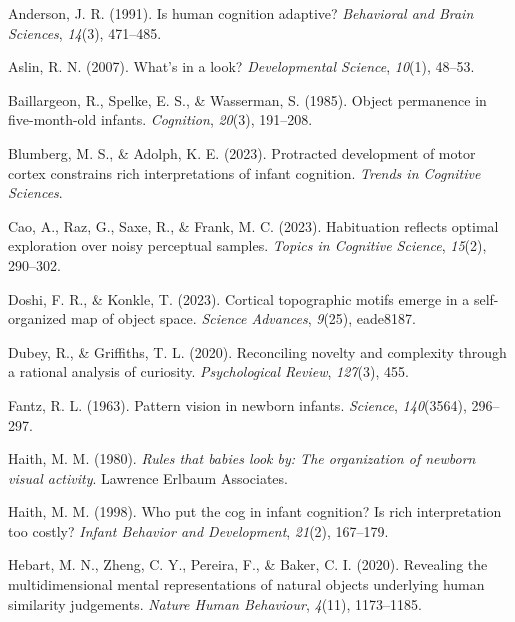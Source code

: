 \documentclass[10pt, letterpaper]{article}
\newenvironment{CSLReferences}%
  {}%
  {\par}
\begin{document}
\hypertarget{refs}{}
\begin{CSLReferences}{1}{0}
\leavevmode{}%
Anderson, J. R. (1991). Is human cognition adaptive? \emph{Behavioral
and Brain Sciences}, \emph{14}(3), 471--485.

\leavevmode{}%
Aslin, R. N. (2007). What's in a look? \emph{Developmental Science},
\emph{10}(1), 48--53.

\leavevmode{}%
Baillargeon, R., Spelke, E. S., \& Wasserman, S. (1985). Object
permanence in five-month-old infants. \emph{Cognition}, \emph{20}(3),
191--208.

\leavevmode{}%
Blumberg, M. S., \& Adolph, K. E. (2023). Protracted development of
motor cortex constrains rich interpretations of infant cognition.
\emph{Trends in Cognitive Sciences}.

\leavevmode{}%
Cao, A., Raz, G., Saxe, R., \& Frank, M. C. (2023). Habituation reflects
optimal exploration over noisy perceptual samples. \emph{Topics in
Cognitive Science}, \emph{15}(2), 290--302.

\leavevmode{}%
Doshi, F. R., \& Konkle, T. (2023). Cortical topographic motifs emerge
in a self-organized map of object space. \emph{Science Advances},
\emph{9}(25), eade8187.

\leavevmode{}%
Dubey, R., \& Griffiths, T. L. (2020). Reconciling novelty and
complexity through a rational analysis of curiosity. \emph{Psychological
Review}, \emph{127}(3), 455.

\leavevmode{}%
Fantz, R. L. (1963). Pattern vision in newborn infants. \emph{Science},
\emph{140}(3564), 296--297.

\leavevmode{}%
Haith, M. M. (1980). \emph{Rules that babies look by: The organization
of newborn visual activity}. Lawrence Erlbaum Associates.

\leavevmode{}%
Haith, M. M. (1998). Who put the cog in infant cognition? Is rich
interpretation too costly? \emph{Infant Behavior and Development},
\emph{21}(2), 167--179.

\leavevmode{}%
Hebart, M. N., Zheng, C. Y., Pereira, F., \& Baker, C. I. (2020).
Revealing the multidimensional mental representations of natural objects
underlying human similarity judgements. \emph{Nature Human Behaviour},
\emph{4}(11), 1173--1185.


\end{CSLReferences}
\end{document}
